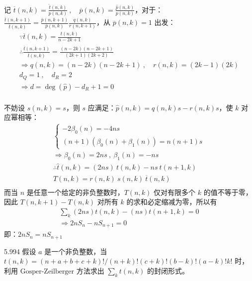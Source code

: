 记 \( \overline{t}(n,k) = \frac{\hat{t}(n,k)}{p(n,k)} \ , \quad \overline{p}(n,k) = \frac{\hat{p}(n,k)}{p(n,k)} \)，对于：\( \frac{\overline{t}(n,k+1)}{\overline{t}(n,k)} = \frac{\overline{p}(n,k+1)}{\overline{p}(n,k)} \frac{q(n,k)}{r(n,k+1)} \)，从 \( \overline{p}(n,k) = 1 \) 出发：
\begin{gather*}
  \because \overline{t}(n,k) = \frac{t(n,k)}{n-2k+1} \\
  \therefore \frac{\overline{t}(n,k+1)}{\overline{t}(n,k)} = \frac{(n-2k)(n-2k+1)}{(2k+1)(2k+2)} \\
  \Rightarrow q(n,k) = (n-2k)(n-2k+1) \ , \quad r(n,k) = (2k-1)(2k) \\
  d_Q = 1 \ , \quad d_R = 2 \\
  \Rightarrow d = \deg{(\hat{p})} - d_R + 1 = 0 \\
\end{gather*}

不妨设 \( s(n,k) = s \)，则 \( s \) 应满足：\( \hat{p}(n,k) = q(n,k)s - r(n,k)s \)，使 \( k \) 对应幂相等：
\begin{gather*}
  \begin{cases}
    -2 \beta_0(n) = -4ns \\
    (n+1) (\beta_0(n) + \beta_1(n)) = n(n+1)s
  \end{cases} \\
  \Rightarrow \beta_0(n) = 2ns \ , \ \beta_1(n) = -ns \\
  \therefore \hat{t}(n,k) = (2ns) \ t(n,k) - ns \ t(n+1,k) \\
  T(n,k) = r(n,k) \ s(n,k) \ \overline{t}(n,k) \\
\end{gather*}
而当 \( n \) 是任意一个给定的非负整数时，\( T(n,k) \) 仅对有限多个 \( k \) 的值不等于零，因此 \( T(n,k+1) - T(n,k) \) 对所有 \( k \) 的求和必定缩减为零，所以有
\begin{gather*}
  \sum_k (2ns)t(n,k) - (ns)t(n+1,k) = 0 \\
  \Rightarrow 2n S_n - n S_{n+1} = 0
\end{gather*}
即：\( 2n S_n = n S_{n+1} \)

\begin{problem}{5.99}{4}
  假设 \( a \) 是一个非负整数，当 \( t(n,k) = (n+a+b+c+k)! / (n+k)! (c+k)! (b-k)! (a-k)! k! \) 时，利用 \( \text{Gosper-Zeilberger} \) 方法求出 \( \sum_k t(n,k) \) 的封闭形式。
\end{problem}

